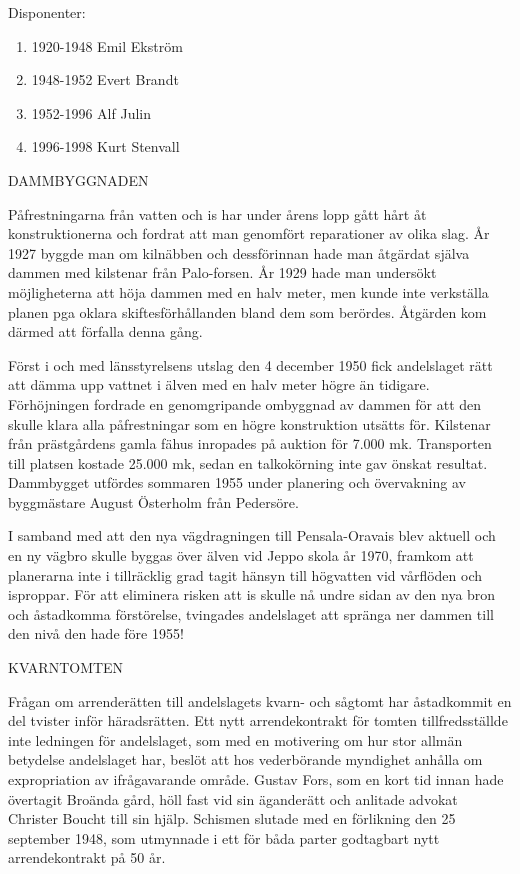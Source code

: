 Disponenter:
\begin{enumerate}
  \item 1920-1948		Emil Ekström
  \item 1948-1952		Evert Brandt
  \item 1952-1996		Alf Julin
  \item 1996-1998	  Kurt Stenvall
\end{enumerate}


DAMMBYGGNADEN

Påfrestningarna från vatten och is har under årens lopp gått hårt åt konstruktionerna och fordrat att man genomfört reparationer av olika slag. År 1927 byggde man om kilnäbben och dessförinnan hade man åtgärdat själva dammen med kilstenar från Palo-forsen. År 1929 hade man undersökt möjligheterna att höja dammen med en halv meter, men kunde inte verkställa planen pga oklara skiftesförhållanden bland dem som berördes. Åtgärden kom därmed att förfalla denna gång.

Först i och med länsstyrelsens utslag den 4 december 1950 fick andelslaget rätt att dämma upp vattnet i älven med en halv meter högre än tidigare. Förhöjningen fordrade en genomgripande ombyggnad av dammen för att den skulle klara alla påfrestningar som en högre konstruktion utsätts för. Kilstenar från prästgårdens gamla fähus inropades på auktion för 7.000 mk. Transporten till platsen kostade 25.000 mk, sedan en talkokörning inte gav önskat resultat. Dammbygget utfördes sommaren 1955 under planering och övervakning av byggmästare August Österholm från Pedersöre.

I samband med att den nya vägdragningen till Pensala-Oravais blev aktuell och en ny vägbro skulle byggas över älven vid Jeppo skola år 1970,  framkom att planerarna inte i tillräcklig grad tagit hänsyn till högvatten vid vårflöden och isproppar. För att eliminera risken att is skulle nå undre sidan av den nya bron och åstadkomma förstörelse, tvingades andelslaget att spränga ner dammen till den nivå den hade före 1955!


KVARNTOMTEN

Frågan om arrenderätten till andelslagets kvarn- och sågtomt har åstadkommit en del tvister inför häradsrätten. Ett nytt arrendekontrakt för tomten tillfredsställde inte ledningen för andelslaget, som med en motivering om hur stor allmän betydelse andelslaget har, beslöt att hos vederbörande myndighet anhålla om expropriation av ifrågavarande område. Gustav Fors, som en kort tid innan hade övertagit Broända gård, höll fast vid sin äganderätt och anlitade advokat Christer Boucht till sin hjälp. Schismen slutade med en förlikning den 25 september 1948, som utmynnade i ett för båda parter godtagbart nytt arrendekontrakt på 50 år.

